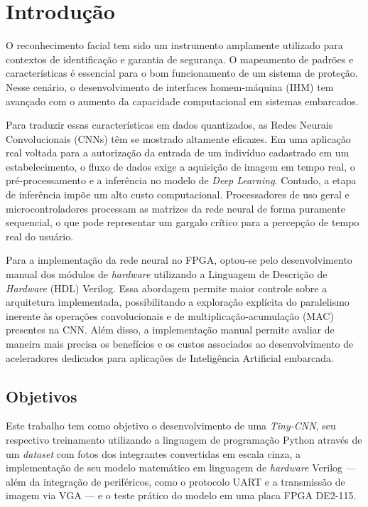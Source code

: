 \chapter{Introdução}
O reconhecimento facial tem sido um instrumento amplamente utilizado para contextos de identificação e garantia de segurança. O mapeamento de padrões e características é essencial para o bom funcionamento de um sistema de proteção. Nesse cenário, o desenvolvimento de interfaces homem-máquina (IHM) tem avançado com o aumento da capacidade computacional em sistemas embarcados.

Para traduzir essas características em dados quantizados, as Redes Neurais Convolucionais (CNNs) têm se mostrado altamente eficazes. Em uma aplicação real voltada para a autorização da entrada de um indivíduo cadastrado em um estabelecimento, o fluxo de dados exige a aquisição de imagem em tempo real, o pré-processamento e a inferência no modelo de \textit{Deep Learning}. Contudo, a etapa de inferência impõe um alto custo computacional. Processadores de uso geral e microcontroladores processam as matrizes da rede neural de forma puramente sequencial, o que pode representar um gargalo crítico para a percepção de tempo real do usuário.

Para a implementação da rede neural no FPGA, optou-se pelo desenvolvimento manual dos módulos de \textit{hardware} utilizando a Linguagem de Descrição de \textit{Hardware} (HDL) Verilog. Essa abordagem permite maior controle sobre a arquitetura implementada, possibilitando a exploração explícita do paralelismo inerente às operações convolucionais e de multiplicação-acumulação (MAC) presentes na CNN. Além disso, a implementação manual permite avaliar de maneira mais precisa os benefícios e os custos associados ao desenvolvimento de aceleradores dedicados para aplicações de Inteligência Artificial embarcada.

\section{Objetivos}
Este trabalho tem como objetivo o desenvolvimento de uma \textit{Tiny-CNN}, seu respectivo treinamento utilizando a linguagem de programação Python através de um \textit{dataset} com fotos dos integrantes convertidas em escala cinza, a implementação de seu modelo matemático em linguagem de \textit{hardware} Verilog --- além da integração de periféricos, como o protocolo UART e a transmissão de imagem via VGA --- e o teste prático do modelo em uma placa FPGA DE2-115.

